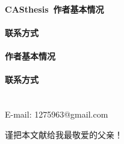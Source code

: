 \begin{publications}


\end{publications}

\begin{resume}

\paragraph{CASthesis~作者基本情况}

\paragraph{联系方式}

\paragraph{作者基本情况}

\paragraph{联系方式}\mbox{}\\

E-mail: 1275963@gmail.com

\end{resume}

\begin{thanks}

谨把本文献给我最敬爱的父亲！

\end{thanks}
